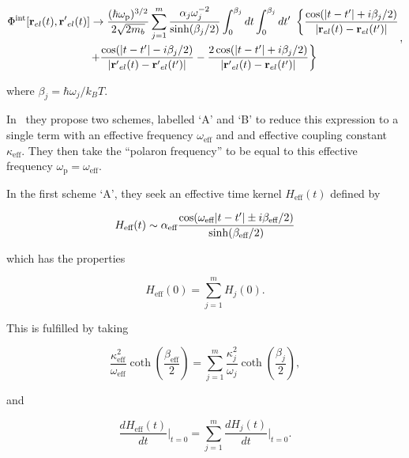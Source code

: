 \begin{equation} \label{eqn:hellwarth_multi_action}
    \begin{gathered}
    \Phi^{\text{int}}[\vb{r}_{el}(t), \vb{r'}_{el}(t)] \rightarrow \frac{(\hbar\omega_{\text{p}})^{3/2}}{2\sqrt{2m_b}} \sum_{j=1}^m \frac{\alpha_j \omega_j^{-2}}{\sinh(\beta_j / 2)} \int^{\beta_j}_0 dt \int^{\beta_j}_0 dt'\ \left\{ \frac{\cos(\abs{t - t'} + i\beta_j / 2)}{\abs{\vb{r}_{el}(t) - \vb{r}_{el}(t')}} \right. \\
    \left. + \frac{\cos(\abs{t - t'} - i\beta_j / 2)}{\abs{\vb{r'}_{el}(t) - \vb{r'}_{el}(t')}} - \frac{2\cos(\abs{t - t'} + i\beta_j / 2)}{\abs{\vb{r'}_{el}(t) - \vb{r}_{el}(t')}} \right\}
    \end{gathered},
\end{equation}

where $\beta_j = \hbar\omega_j / k_B T$. 

In~\cite{hellwarth_mobility_1999} they propose two schemes, labelled `A' and `B' to reduce this expression to a single term with an effective frequency $\omega_{\text{eff}}$ and and effective coupling constant $\kappa_{\text{eff}}$. They then take the ``polaron frequency'' to be equal to this effective frequency $\omega_{\text{p}} = \omega_{\text{eff}}$. 

In the first scheme `A', they seek an effective time kernel $H_{\text{eff}}(t)$ defined by

\begin{equation}
    H_{\text{eff}}(t) \sim \alpha_{\text{eff}} \frac{\cos(\omega_{\text{eff}}\abs{t - t'} \pm i\beta_{\text{eff}} / 2)}{\sinh(\beta_{\text{eff}} / 2)}
\end{equation}

which has the properties

\begin{equation} \label{eqn:hellwarth_scheme_s}
    H_{\text{eff}}(0) = \sum_{j=1}^m H_{j}(0).
\end{equation}

This is fulfilled by taking

\begin{equation}
    \frac{\kappa_{\text{eff}}^2}{\omega_{\text{eff}}} \coth(\frac{\beta_{\text{eff}}}{2}) = \sum_{j=1}^m \frac{\kappa_{j}^2}{\omega_{j}} \coth(\frac{\beta_{j}}{2}),
\end{equation}

and

\begin{equation}
    \frac{dH_{\text{eff}}(t)}{dt} \biggr\rvert_{t=0} = \sum_{j=1}^m \frac{dH_{j}(t)}{dt} \biggr\rvert_{t=0}.
\end{equation}

